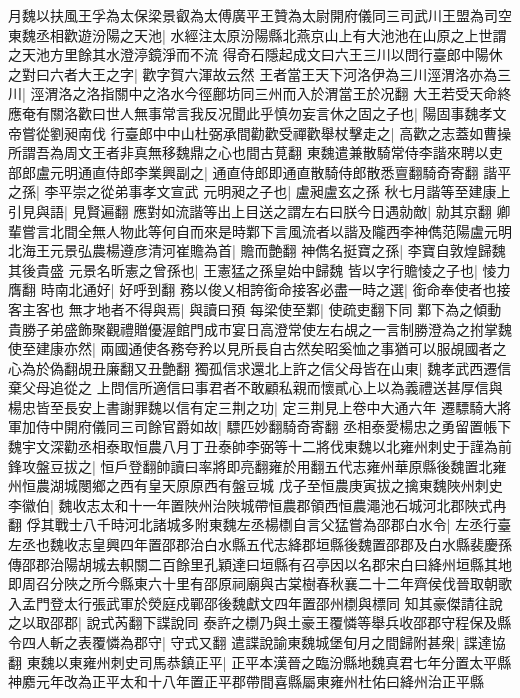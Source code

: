 月魏以扶風王孚為太保梁景叡為太傅廣平王贊為太尉開府儀同三司武川王盟為司空　東魏丞相歡遊汾陽之天池|{
	水經注太原汾陽縣北燕京山上有大池池在山原之上世謂之天池方里餘其水澄渟鏡淨而不流}
得奇石隱起成文曰六王三川以問行臺郎中陽休之對曰六者大王之字|{
	歡字賀六渾故云然}
王者當王天下河洛伊為三川涇渭洛亦為三川|{
	涇渭洛之洛指關中之洛水今徑鄜坊同三州而入於渭當王於况翻}
大王若受天命終應奄有關洛歡曰世人無事常言我反况聞此乎慎勿妄言休之固之子也|{
	陽固事魏孝文帝嘗從劉昶南伐}
行臺郎中中山杜弼承間勸歡受禪歡舉杖擊走之|{
	高歡之志蓋如曹操所謂吾為周文王者非真無移魏鼎之心也間古莧翻}
東魏遣兼散騎常侍李諧來聘以吏部郎盧元明通直侍郎李業興副之|{
	通直侍郎即通直散騎侍郎散悉亶翻騎奇寄翻}
諧平之孫|{
	李平崇之從弟事孝文宣武}
元明昶之子也|{
	盧昶盧玄之孫}
秋七月諧等至建康上引見與語|{
	見賢遍翻}
應對如流諧等出上目送之謂左右曰朕今日遇勍敵|{
	勍其京翻}
卿輩嘗言北間全無人物此等何自而來是時鄴下言風流者以諧及隴西李神儁范陽盧元明北海王元景弘農楊遵彦清河崔贍為首|{
	贍而艶翻}
神儁名挺寶之孫|{
	李寶自敦煌歸魏其後貴盛}
元景名昕憲之曾孫也|{
	王憲猛之孫皇始中歸魏}
皆以字行贍㥄之子也|{
	㥄力膺翻}
時南北通好|{
	好呼到翻}
務以俊乂相誇銜命接客必盡一時之選|{
	銜命奉使者也接客主客也}
無才地者不得與焉|{
	與讀曰預}
每梁使至鄴|{
	使疏吏翻下同}
鄴下為之傾動貴勝子弟盛飾聚觀禮贈優渥館門成市宴日高澄常使左右覘之一言制勝澄為之拊掌魏使至建康亦然|{
	兩國通使各務夸矜以見所長自古然矣昭奚恤之事猶可以服覘國者之心為於偽翻覘丑廉翻又丑艶翻}
獨孤信求還北上許之信父母皆在山東|{
	魏孝武西遷信棄父母追從之}
上問信所適信曰事君者不敢顧私親而懷貳心上以為義禮送甚厚信與楊忠皆至長安上書謝罪魏以信有定三荆之功|{
	定三荆見上卷中大通六年}
遷驃騎大將軍加侍中開府儀同三司餘官爵如故|{
	驃匹妙翻騎奇寄翻}
丞相泰愛楊忠之勇留置帳下　魏宇文深勸丞相泰取恒農八月丁丑泰帥李弼等十二將伐東魏以北雍州刺史于謹為前鋒攻盤豆拔之|{
	恒戶登翻帥讀曰率將即亮翻雍於用翻五代志雍州華原縣後魏置北雍州恒農湖城閿鄉之西有皇天原原西有盤豆城}
戊子至恒農庚寅拔之擒東魏陜州刺史李徽伯|{
	魏收志太和十一年置陜州治陜城帶恒農郡領西恒農澠池石城河北郡陜式冉翻}
俘其戰士八千時河北諸城多附東魏左丞楊檦自言父猛嘗為邵郡白水令|{
	左丞行臺左丞也魏收志皇興四年置邵郡治白水縣五代志絳郡垣縣後魏置邵郡及白水縣裴慶孫傳邵郡治陽胡城去軹關二百餘里孔穎達曰垣縣有召亭因以名郡宋白曰絳州垣縣其地即周召分陜之所今縣東六十里有邵原祠廟與古棠樹春秋襄二十二年齊侯伐晉取朝歌入孟門登太行張武軍於熒庭戍鄲邵後魏獻文四年置邵州檦與標同}
知其豪傑請往說之以取邵郡|{
	說式芮翻下諜說同}
泰許之檦乃與土豪王覆憐等舉兵收邵郡守程保及縣令四人斬之表覆憐為郡守|{
	守式又翻}
遣諜說諭東魏城堡旬月之間歸附甚衆|{
	諜達協翻}
東魏以東雍州刺史司馬恭鎮正平|{
	正平本漢晉之臨汾縣地魏真君七年分置太平縣神䴥元年改為正平太和十八年置正平郡帶間喜縣屬東雍州杜佑曰絳州治正平縣}

